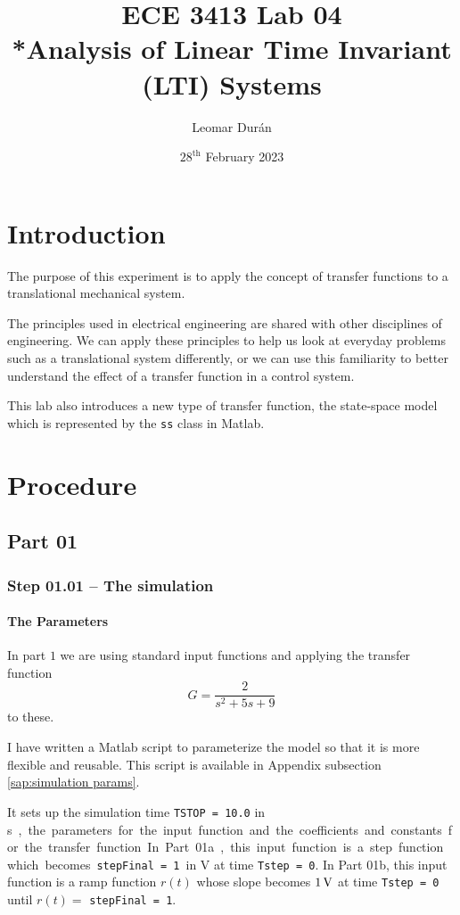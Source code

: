 \documentclass[12pt]{article}
\title{ECE 3413 Lab 04\\*Analysis of Linear Time Invariant (LTI) Systems}
\author{Leomar Dur\'an}
\date{${28}^{\text{th}}$ February 2023}
\begin{document}
\maketitle
\newpage

\section{Introduction}

The purpose of this experiment is to apply the concept of transfer functions to a translational mechanical system.

The principles used in electrical engineering are shared with other disciplines of engineering.
We can apply these principles to help us look at everyday problems such as a translational system differently,
or we can use this familiarity to better understand the effect of a transfer function in a control system.

This lab also introduces a new type of transfer function, the state-space model which is represented by the \texttt{ss} class in Matlab.

\section{Procedure}

\subsection{Part 01}

\subsubsection{Step 01.01 -- The simulation}

\paragraph{The Parameters}

In part $1$ we are using standard input functions and applying the transfer function
$$
    G = \frac2{s^2 + 5 s + 9}
$$
to these.

I have written a Matlab script to parameterize the model so that it is more flexible and reusable.
This script is available in Appendix subsection \ref{sap:simulation params}.

It sets up the simulation time \texttt{TSTOP = 10.0} in \si\second, the parameters for the input function and the coefficients and constants for the transfer function.
In Part 01a, this input function is a step function which becomes \texttt{stepFinal = 1} in $\si\volt$ at time \texttt{Tstep = 0}.
In Part 01b, this input function is a ramp function $r(t)$ whose slope becomes $\SI1\volt$ at time \texttt{Tstep = 0} until $r(t) =$ \texttt{stepFinal = 1}.
\end{document}
